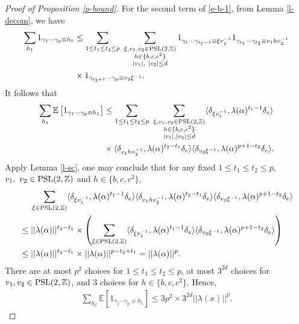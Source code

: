 \documentclass{amsart}
\theoremstyle{plain}
\theoremstyle{definition}
\theoremstyle{remark}
\begin{document}
\begin{proof}[Proof of Proposition \ref{p-bound}]
        For the second term of \eqref{e-b-1}, from Lemma \ref{l-decom}, we have 
        \begin{align*}
            \sum\limits_{h_1}1_{\gamma_1\cdots\gamma_p\equiv h_1}&\leq \sum\limits_{1\leq t_1\leq t_2\leq p}\ \sum\limits_{\substack{\xi,v_1,v_2\in\textnormal{PSL}(2,\mathbb{Z})\\ h\in\{b,c,c^2\} \\|v_1|,\ |v_2|\leq d}}1_{\gamma_1\cdots\gamma_{t_1-1}\equiv \xi v_1^{-1}}1_{\gamma_{t_1}\cdots\gamma_{t_2}\equiv v_1hv_2^{-1}}\\
            &\times1_{\gamma_{t_2+1}\cdots\gamma_p\equiv v_2\xi^{-1}}.
        \end{align*}
        It follows that
        \begin{align*}
          \sum\limits_{h_1}\mathbb{E}\left[1_{\gamma_1\cdots\gamma_p\equiv h_1}\right]&\leq\sum\limits_{1\leq t_1\leq t_2\leq p}\ \sum\limits_{\substack{\xi,v_1,v_2\in\textnormal{PSL}(2,\mathbb{Z})\\ h\in\{b,c,c^2\}\\|v_1|,|v_2|\leq d}}\langle\delta_{\xi v_1^{-1}},\lambda(\alpha)^{t_1-1}\delta_e\rangle\\
          &\times \langle\delta_{v_1hv_2^{-1}},\lambda(\alpha)^{t_2-t_1}\delta_e\rangle\langle\delta_{v_2\xi^{-1}},\lambda(\alpha)^{p+1-t_2}\delta_e\rangle.
        \end{align*}
        Apply Lemma \ref{l-sc}, one may conclude that for any fixed $1\leq t_1\leq t_2\leq p$,  $v_1,\ v_2\in\textnormal{PSL}(2,\mathbb{Z})$ and $h\in\{b,c,c^2\}$,
        \begin{align*}
            &\ \ \ \ \sum\limits_{\xi\in\textnormal{PSL}(2,\mathbb{Z})}\langle\delta_{\xi v_1^{-1}},\lambda(\alpha)^{t_1-1}\delta_e\rangle\langle\delta_{v_1hv_2^{-1}},\lambda(\alpha)^{t_2-t_1}\delta_e\rangle\langle\delta_{v_2\xi^{-1}},\lambda(\alpha)^{p+1-t_2}\delta_e\rangle\\
            &\leq||\lambda(\alpha)||^{t_2-t_1}\times\left(\sum\limits_{\xi\in\textnormal{PSL}(2,\mathbb{Z})}\langle\delta_{\xi v_1^{-1}},\lambda(\alpha)^{t_1-1}\delta_e\rangle\langle\delta_{v_2\xi^{-1}},\lambda(\alpha)^{p+1-t_2}\delta_e\rangle\right)\\
            &\leq||\lambda(\alpha)||^{t_2-t_1}\times ||\lambda(\alpha)||^{p-t_2+t_1} =||\lambda(\alpha)||^p.
        \end{align*}
        There are at most $p^2$ choices for $1\leq t_1\leq t_2\leq p$, at most $3^{2d}$ choices for $v_1,v_2\in\textnormal{PSL}(2,\mathbb{Z})$, and $3$ choices for $h\in\{b,c,c^2\}$. Hence,
        \begin{align}\label{e-b-2}
        \sum\limits_{h_1}\mathbb{E}\left[1_{\gamma_1\cdots\gamma_p\equiv h_1}\right]\leq 3p^2\times 3^{2d}||\lambda(x)||^p.
        \end{align}
        

\end{proof}
\end{document}
